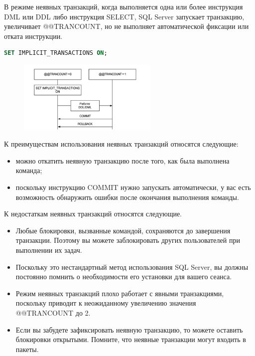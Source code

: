 В режиме неявных транзакций, когда выполняется одна или более инструкция DML или DDL либо инструкция SELECT, SQL Server запускает транзакцию, увеличивает @@TRANCOUNT, но не выполняет автоматической фиксации
или отката инструкции.

\begin{lstlisting}[label=lst:funcReturn, language=sql]
	SET IMPLICIT_TRANSACTIONS ON;
\end{lstlisting}


\begin{figure}[h!]
	\begin{center}
		\includegraphics[width=0.6\textwidth]{img/t2.png}
	\end{center}
	\captionsetup{justification=centering}
\end{figure}

К преимуществам использования неявных транзакций относятся следующие:
\begin{itemize}
	\item можно откатить неявную транзакцию после того, как была выполнена команда; 
	\item поскольку инструкцию COMMIT нужно запускать автоматически, у вас есть возможность обнаружить ошибки после окончания выполнения команды. 
\end{itemize}

К недостаткам неявных транзакций относятся следующие. 
\begin{itemize}
	\item Любые блокировки, вызванные командой, сохраняются до завершения транзакции. Поэтому вы можете заблокировать других пользователей при выполнении
	их задач. 
	\item Поскольку это нестандартный метод использования SQL Server, вы должны постоянно помнить о необходимости его установки для вашего сеанса. 
	\item Режим неявных транзакций плохо работает с явными транзакциями, поскольку
	приводит к неожиданному увеличению значения @@TRANCOUNT до 2. 
	\item Если вы забудете зафиксировать неявную транзакцию, то можете оставить блокировки открытыми. Помните, что неявные транзакции могут входить в пакеты. 
\end{itemize}

